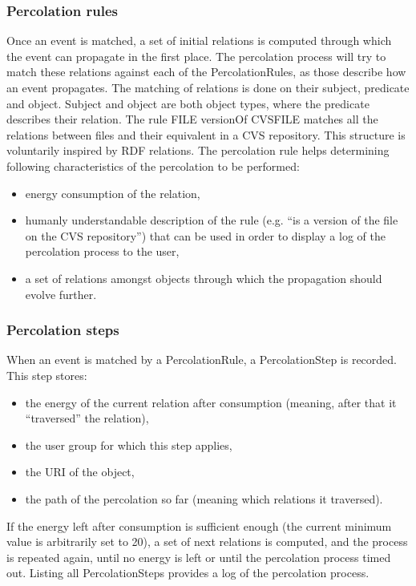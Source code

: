 \documentclass{ecscw2007}
\begin{document}
\subsubsection*{Percolation rules}
Once an event is matched, a set of initial relations is computed through which the event can propagate in the first place. The percolation process will try to match these relations against each of the PercolationRules, as those describe how an event propagates.
The matching of relations is done on their subject, predicate and object. Subject and object are both object types, where the predicate describes their relation. The rule
FILE versionOf CVSFILE
matches all the relations between files and their equivalent in a CVS repository. This structure is voluntarily inspired by RDF relations.
The percolation rule helps determining following characteristics of the percolation to be performed:
\begin{itemize}
    \item energy consumption of the relation,
    \item humanly understandable description of the rule (e.g. “is a version of the file on the CVS repository”) that can be used in order to display a log of the percolation process to the user,
    \item  a set of relations amongst objects through which the propagation should evolve further.
\end{itemize}

\subsubsection*{Percolation steps}
When an event is matched by a PercolationRule, a PercolationStep is recorded. This step stores:
\begin{itemize}
	\item the energy of the current relation after consumption (meaning, after that it “traversed” the relation),
    \item the user group for which this step applies,
    \item the URI of the object,
    \item the path of the percolation so far (meaning which relations it traversed).
\end{itemize}
    
If the energy left after consumption is sufficient enough (the current minimum value is arbitrarily set to 20), a set of next relations is computed, and the process is repeated again, until no energy is left or until the percolation process timed out.
Listing all PercolationSteps provides a log of the percolation process.
\end{document}
